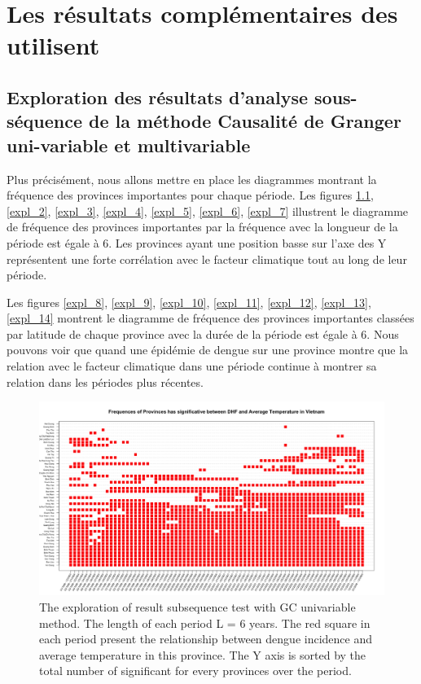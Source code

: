 \chapter{Les r\'esultats compl\'ementaires des \mt utilisent }

\label{annexe}
\section{Exploration des résultats d'analyse sous-séquence de la méthode Causalité de Granger uni-variable et multivariable}

Plus précisément, nous allons mettre en place les diagrammes montrant la fréquence des provinces importantes pour chaque période. Les figures \ref {expl_1}, \ref {expl_2}, \ref {expl_3}, \ref {expl_4}, \ref {expl_5}, \ref {expl_6}, \ref {expl_7} illustrent le diagramme de fréquence des provinces importantes par la fréquence avec la longueur de la période est égale à 6. Les provinces ayant une position basse sur l’axe des Y représentent une forte corrélation avec le facteur climatique tout au long de leur période. 

Les figures \ref {expl_8}, \ref {expl_9}, \ref {expl_10}, \ref {expl_11}, \ref {expl_12}, \ref {expl_13}, \ref {expl_14} montrent le diagramme de fréquence des provinces importantes classées par latitude de chaque province avec la durée de la période est égale à 6. Nous pouvons voir que quand une épidémie de dengue sur une province montre que la relation avec le facteur climatique dans une période continue à montrer sa relation dans les périodes plus récentes.


\begin{figure}[h]
\begin{center}
\includegraphics[width = \linewidth]{../figures/annexe/result_ta.png}
\caption{The exploration of result subsequence test with GC univariable method. The length of each period L = 6 years. The red square in each period present the relationship between dengue incidence and average temperature in this province. The Y axis is sorted by the total number of significant for every provinces over the period. }
\label{expl_1}	
\end{center}
\end{figure}

